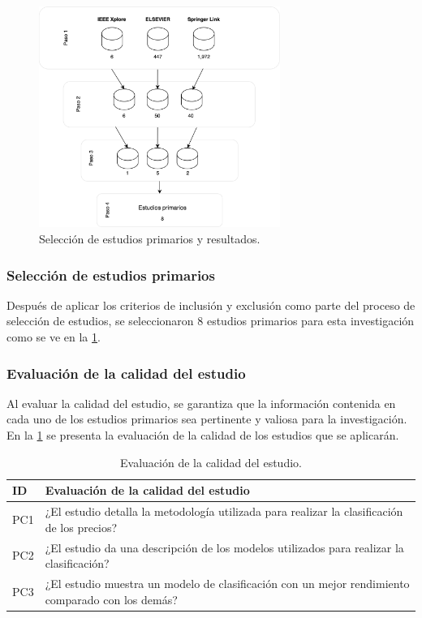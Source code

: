 \begin{figure}[h!]
	\centering
	\includegraphics[width=0.7\textwidth]{Chapter2/SelecEstudiPrim_3.png}
	\caption{Selección de estudios primarios y resultados.}
	\label{fig3}
\end{figure}

\subsubsection{Selección de estudios primarios}
Después de aplicar los criterios de inclusión y exclusión como parte del proceso de selección de estudios, se seleccionaron 8 estudios primarios para esta investigación como se ve en la \cref{fig3}.\\

\subsubsection{Evaluación de la calidad del estudio}
Al evaluar la calidad del estudio, se garantiza que la información contenida en cada uno de los estudios primarios sea pertinente y valiosa para la investigación. En la \cref{tab:Table7} se presenta la evaluación de la calidad de los estudios que se aplicarán.

\begin{table}[H]
	\centering
	\begin{tabular}{ | m{2cm}| m{12cm} | }
		\hline
		\textbf{ID} & \textbf{Evaluación de la calidad del estudio}\\
		\hline
		PC1 & ¿El estudio detalla la metodología utilizada para realizar la clasificación de los precios?\\
		\hline
		PC2 & ¿El estudio da una descripción de los modelos utilizados para realizar la clasificación?\\
		\hline
		PC3 & ¿El estudio muestra un modelo de clasificación con un mejor rendimiento comparado con los demás?\\
		\hline
	\end{tabular}
	\caption{Evaluación de la calidad del estudio.}
	\label{tab:Table7}
\end{table}

